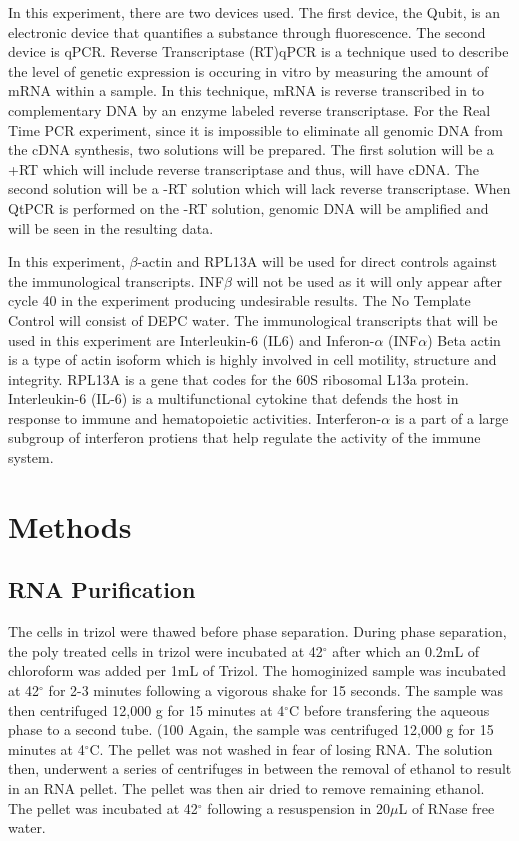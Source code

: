 \documentclass[journal, a4paper]{IEEEtran}
\begin{document}
  In this experiment, there are two devices used. The first device, the Qubit, is an electronic device that quantifies a substance through fluorescence.
  The second device is qPCR.
  Reverse Transcriptase (RT)qPCR is a technique used to describe the level of genetic expression is occuring in vitro
  by measuring the amount of mRNA within a sample. In this technique, mRNA is reverse transcribed in to complementary DNA by
  an enzyme labeled reverse transcriptase.
  For the Real Time PCR experiment, since it is impossible to eliminate all genomic DNA from the cDNA synthesis, two solutions will be prepared.
  The first solution will be a +RT which will include reverse transcriptase and thus, will have cDNA.
  The second solution will be a -RT solution which will lack reverse transcriptase.
  When QtPCR is performed on the -RT solution, genomic DNA will be amplified and will be seen in the resulting data.

  In this experiment, $\beta$-actin and RPL13A will be used for direct controls against the immunological transcripts.
  INF$\beta$ will not be used as it will only appear after cycle 40 in the experiment producing undesirable results.
  The No Template Control will consist of DEPC water.
  The immunological transcripts that will be used in this experiment are Interleukin-6 (IL6) and Inferon-$\alpha$ (INF$\alpha$)
  Beta actin is a type of actin isoform which is highly involved in cell motility, structure and integrity.
  RPL13A is a gene that codes for the 60S ribosomal L13a protein.
  Interleukin-6 (IL-6) is a multifunctional cytokine that defends the host in response to immune and hematopoietic activities.
  Interferon-$\alpha$ is a part of a large subgroup of interferon protiens that help regulate the activity of the immune system.




\section{Methods}
    \subsection{RNA Purification}
      The cells in trizol were thawed before phase separation. During phase separation,
      the poly treated cells in trizol were incubated at 42$^{\circ}$ after which an 0.2mL of chloroform was added per 1mL of Trizol.
      The homoginized sample was incubated at 42$^{\circ}$ for 2-3 minutes following a vigorous shake for 15 seconds.
      The sample was then centrifuged 12,000 g for 15 minutes at 4$^{\circ}$C before transfering the aqueous phase
      to a second tube. (100%
      Again, the sample was centrifuged 12,000 g for 15 minutes at 4$^{\circ}$C.
      The pellet was not washed in fear of losing RNA.
      The solution then, underwent a series of centrifuges in between the removal of ethanol to result in an RNA pellet.
      The pellet was then air dried to remove remaining ethanol.
      The pellet was incubated at 42$^{\circ}$ following a resuspension in 20$\mu$L of RNase free water.
\end{document}
